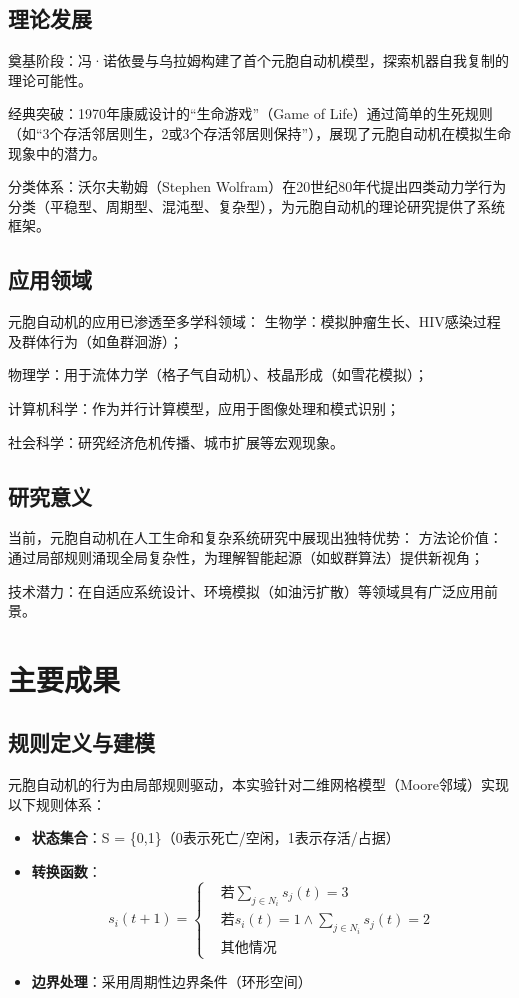 \documentclass[forprint]{WHUBachelor}
\begin{document}
\subsection{理论发展}
奠基阶段：冯·诺依曼与乌拉姆构建了首个元胞自动机模型，探索机器自我复制的理论可能性。  

经典突破：1970年康威设计的“生命游戏”（Game of Life）通过简单的生死规则（如“3个存活邻居则生，2或3个存活邻居则保持”），展现了元胞自动机在模拟生命现象中的潜力。  

分类体系：沃尔夫勒姆（Stephen Wolfram）在20世纪80年代提出四类动力学行为分类（平稳型、周期型、混沌型、复杂型），为元胞自动机的理论研究提供了系统框架。

\subsection{应用领域}

元胞自动机的应用已渗透至多学科领域：  
生物学：模拟肿瘤生长、HIV感染过程及群体行为（如鱼群洄游）；  

物理学：用于流体力学（格子气自动机）、枝晶形成（如雪花模拟）；  

计算机科学：作为并行计算模型，应用于图像处理和模式识别；  

社会科学：研究经济危机传播、城市扩展等宏观现象。

\subsection{研究意义}

当前，元胞自动机在人工生命和复杂系统研究中展现出独特优势：  
方法论价值：通过局部规则涌现全局复杂性，为理解智能起源（如蚁群算法）提供新视角；  

技术潜力：在自适应系统设计、环境模拟（如油污扩散）等领域具有广泛应用前景。  


\section{主要成果}

\subsection{规则定义与建模}
元胞自动机的行为由局部规则驱动，本实验针对二维网格模型（Moore邻域）实现以下规则体系：
\begin{itemize}
    \item \textbf{状态集合}：S = \{0,1\}（0表示死亡/空闲，1表示存活/占据）
    \item \textbf{转换函数}：
    \[
    s_i(t+1) = 
    \begin{cases}
& \text{若} \sum_{j \in N_i} s_j(t) = 3 \\

& \text{若} s_i(t)=1 \land \sum_{j \in N_i} s_j(t) = 2 \\

& \text{其他情况}

    \end{cases}
    \]
    \item \textbf{边界处理}：采用周期性边界条件（环形空间）
\end{itemize}
\end{document}
